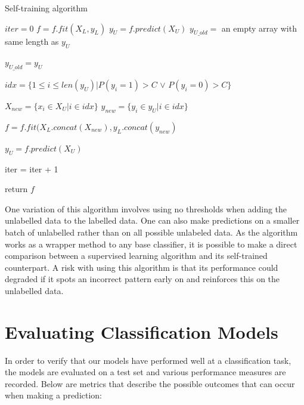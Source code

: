 \documentclass[../main.tex]{subfiles}
\begin{document}
\begin{algorithm} [H]
    \caption{Self-training algorithm \cite{zhu2007semi}}
    \label{algorithm:selfTrain}
    \begin{algorithmic}[H]
            \State $iter = 0$
            \State $f = f.fit(X_L, y_L)$
            \State $y_U = f.predict(X_U)$
            \State $y_{U\_old} =$ an empty array with same length as $y_U$
            
                \State $y_{U\_old} = y_{U}$
                
                \State $idx = \{1 \leq i \leq len(y_U) | P(y_i=1) > C$  $\vee$ $P(y_i=0) > C\}$
                
                \State $X_{new} = \{x_i \in X_U | i \in idx\}$  
                \State $y_{new} = \{y_i \in y_U | i \in idx\}$
                
                \State $f = f.fit(X_L.concat(X_{new}), y_L.concat(y_{new})$

                \State $y_U = f.predict(X_U)$

                \State iter = iter + 1

            \EndWhile
            \State return $f$
        \EndProcedure
    \end{algorithmic}
\end{algorithm}



One variation of this algorithm involves using no thresholds when adding the unlabelled data to the labelled data. One can also make predictions on a smaller batch of unlabelled rather than on all possible unlabeled data. As the algorithm works as a wrapper method to any base classifier, it is possible to make a direct comparison between a supervised learning algorithm and its self-trained counterpart. A risk with using this algorithm is that its performance could degraded if it spots an incorrect pattern early on and reinforces this on the unlabelled data. 

\section{Evaluating Classification Models}

In order to verify that our models have performed well at a classification task, the models are evaluated on a test set and various performance measures are recorded. Below are metrics that describe the possible outcomes that can occur when making a prediction:
\end{document}
